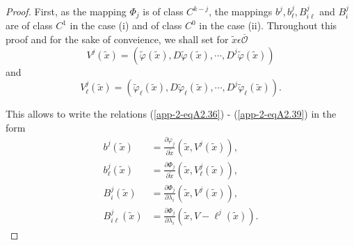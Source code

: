 \begin{proof}
First, as the mapping $\Phi_{j}$ is of class $C^{k-j}$, the mappings
$b^{j}, b_{\ell}^{j}, B_{i\ell}^{j}$ and $B_{i}^{j}$ are of class
$C^{1}$ in the case (i) and of class $C^{0}$ in the case
(ii). Throughout this proof and for the sake of conveience, we shall
set for $ \widetilde{x} \epsilon \overline{\mathscr{O}}$
\begin{equation*}
V^{j} ( \widetilde{x}) = ( \widetilde{\varphi}( \widetilde{x}), D
\widetilde{\varphi}( \widetilde{x}), \cdots , D^{j} \widetilde{\varphi}( \widetilde{x}))\tag{A2.40}\label{app-2-eqA2.40}
\end{equation*}
and
\begin{equation*}
V_{\ell}^{j}( \widetilde{x}) = ( \widetilde{\varphi}_{\ell}(
\widetilde{x}), D \widetilde{\varphi}_{\ell}( \widetilde{x}), \cdots ,
D^{j} \widetilde{\varphi}_{\ell}( \widetilde{x})).\tag{A2.41}\label{app-2-eqA2.41}
\end{equation*}

This allows to write the relations (\ref{app-2-eqA2.36}) - (\ref{app-2-eqA2.39}) in the form
\begin{align*}
b^{j}( \widetilde{x}) & = \frac{\partial \varphi_{j}}{\partial
  \widetilde{x}} (\widetilde{x}, V^{j} (
\widetilde{x})),\tag{A2.42}\label{app-2-eqA2.42}\\
b_{\ell}^{j} (\widetilde{x}) & = \frac{\partial \Phi_{j}}{\partial
  \widetilde{x}} (\widetilde{x}, V_{\ell}^{j}
(\widetilde{x})),\tag{A2.43}\label{app-2-eqA2.43}\\
B_{i}^{j} (\widetilde{x}) & = \frac{\partial \Phi_{j}}{\partial
  \lambda_{i}} (\widetilde{x}, V^{j} (\widetilde{x})),\tag{A2.44}\label{app-2-eqA2.44}\\
B_{i\ell}^{j} (\widetilde{x}) & = \frac{\partial \Phi_{j}}{\partial
  \lambda_{i}} (\widetilde{x}, V-{\ell}^{j} (\widetilde{x})).\tag{A2.45}\label{app-2-eqA2.45}
\end{align*}\pageoriginale


\end{proof}
